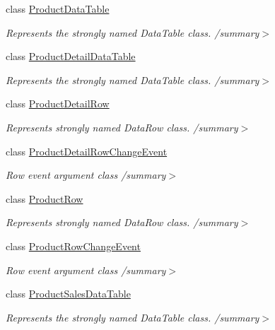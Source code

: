 \begin{DoxyCompactItemize}
class \hyperlink{class_products_1_1_data_1_1ds_sage_1_1_product_data_table}{Product\+Data\+Table}
\begin{DoxyCompactList}\small\item\em Represents the strongly named Data\+Table class. /summary$>$ \end{DoxyCompactList}\item 
class \hyperlink{class_products_1_1_data_1_1ds_sage_1_1_product_detail_data_table}{Product\+Detail\+Data\+Table}
\begin{DoxyCompactList}\small\item\em Represents the strongly named Data\+Table class. /summary$>$ \end{DoxyCompactList}\item 
class \hyperlink{class_products_1_1_data_1_1ds_sage_1_1_product_detail_row}{Product\+Detail\+Row}
\begin{DoxyCompactList}\small\item\em Represents strongly named Data\+Row class. /summary$>$ \end{DoxyCompactList}\item 
class \hyperlink{class_products_1_1_data_1_1ds_sage_1_1_product_detail_row_change_event}{Product\+Detail\+Row\+Change\+Event}
\begin{DoxyCompactList}\small\item\em Row event argument class /summary$>$ \end{DoxyCompactList}\item 
class \hyperlink{class_products_1_1_data_1_1ds_sage_1_1_product_row}{Product\+Row}
\begin{DoxyCompactList}\small\item\em Represents strongly named Data\+Row class. /summary$>$ \end{DoxyCompactList}\item 
class \hyperlink{class_products_1_1_data_1_1ds_sage_1_1_product_row_change_event}{Product\+Row\+Change\+Event}
\begin{DoxyCompactList}\small\item\em Row event argument class /summary$>$ \end{DoxyCompactList}\item 
class \hyperlink{class_products_1_1_data_1_1ds_sage_1_1_product_sales_data_table}{Product\+Sales\+Data\+Table}
\begin{DoxyCompactList}\small\item\em Represents the strongly named Data\+Table class. /summary$>$ \end{DoxyCompactList}\item 

\end{DoxyCompactItemize}
